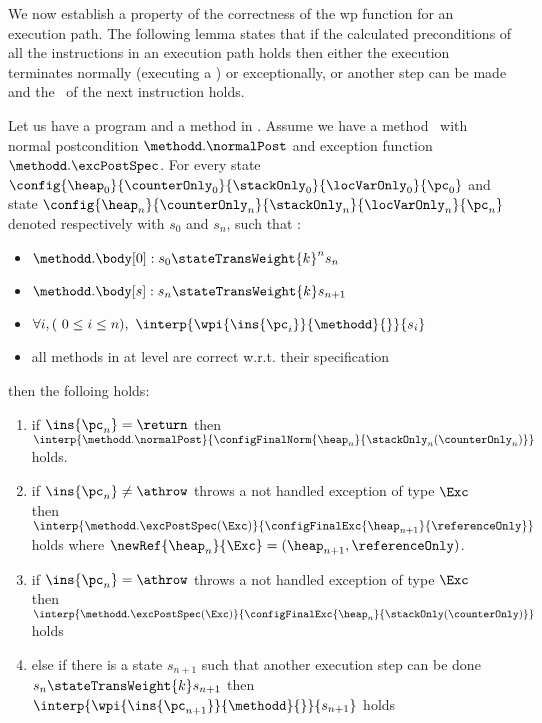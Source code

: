We now establish a property of the correctness of the wp function  for an execution path. The following lemma states that if the calculated preconditions
of all the instructions in an execution path holds then either the execution terminates normally (executing a \return) or exceptionally, or 
another step can be made and the \fwpi \ of the next instruction holds.



\begin{lemma} \label{lemma1}
Let us have a program \Program{} and a method \methodd{} in \Program.
Assume we have a method \methodd \ with normal postcondition  $\methodd.\normalPost$ and exception function $\methodd.\excPostSpec$. 
For every state  
 $ \config{\heap_{0}}{\counterOnly_{0}}{\stackOnly_{0}}{\locVarOnly_{0}}{\pc_{0}}$ 
and state $\config{\heap_n}{\counterOnly_n}{\stackOnly_n}{\locVarOnly_n}{\pc_n} $ denoted respectively with $s_0$ and  $s_n$,
such that :
 \begin{itemize}
         \item $ \methodd.\body[0] : s_{0} \stateTransWeight{k}^{n} s_n$
         \item $ \methodd.\body[s] : s_n \stateTransWeight{k} s_{n+1}$
         \item $ \forall i, (\ 0 \leq i \leq n ) , \ \interp{\wpi{\ins{\pc_{i}} }{ \methodd } {  }}{ s_i } $ 
	 \item  all methods in \Program{} at level  are correct w.r.t. their specification
 \end{itemize}

then the folloing holds:
\begin{enumerate}
	\item if $\ins{\pc_n} = \return$  then $\interp{\methodd.\normalPost} {\configFinalNorm{\heap_n}{\stackOnly_n( \counterOnly_n )}} $ holds.  
	
	\item if $\ins{\pc_n}\neq \athrow  $ throws a not handled exception of type $\Exc$ \\ then
	$\interp{\methodd.\excPostSpec( \Exc)}{\configFinalExc{ \heap_{n+1}}{  \referenceOnly   } } $ holds 
	where $\newRef{\heap_n}{\Exc} = (\heap_{n+1}, \referenceOnly )$.
	
	 \item if $\ins{\pc_n} = \athrow $ throws a not handled exception of type $\Exc$ \\
	 then $\interp{\methodd.\excPostSpec( \Exc)}{\configFinalExc{ \heap_{n}}{  \stackOnly (\counterOnly)   } } $ holds 
	
	
	\item else if there is a state $s_{n+1}$ such that another execution step can be done 
	 $s_n  \stateTransWeight{k} s_{n+1}$ then  $\interp{ \wpi{\ins{\pc_{n+1}}}{\methodd}{  } } { s_{n+1} } $  holds
\end{enumerate}
\end{lemma}

